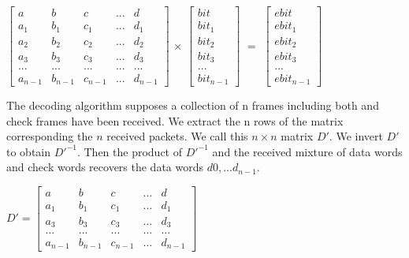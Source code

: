 \vspace{0.5cm}

\begin{center}
$
\begin{bmatrix} 
a   & b   & c   & ... & d   \\
a_1 & b_1 & c_1 & ... & d_1 \\
a_2 & b_2 & c_2 & ... & d_2 \\
a_3 & b_3 & c_3 & ... & d_3 \\
... & ... & ... & ... & ... \\
a_{n-1} & b_{n-1} & c_{n-1} & ... & d_{n-1} 
\end{bmatrix}
$
$\times$
$
\begin{bmatrix} 
bit \\ bit_1 \\ bit_2 \\ bit_3 \\...\\bit_{n-1} 
\end{bmatrix} 
$
$=$
$
\begin{bmatrix} 
ebit \\ ebit_1 \\ ebit_2 \\ ebit_3 \\ ... \\ ebit_{n-1} 
\end{bmatrix}
$
\end{center}

\vspace{0.5cm}

The decoding algorithm supposes a collection of n frames including both \ControlMessage  and check frames have been received. 
We extract the n rows of the matrix corresponding the $n$ received packets. We call this $n \times n$ matrix $D'$. We invert $D'$ to obtain $D'^{-1}$.
Then the product of $D'^{-1}$ and the received mixture of data words and check words recovers the data words $d0, ...d_{n-1}$.

\begin{center}
$D'=
\begin{bmatrix} 
a   & b   & c   & ... & d   \\
a_1 & b_1 & c_1 & ... & d_1 \\
a_3 & b_3 & c_3 & ... & d_3 \\
... & ... & ... & ... & ... \\
a_{n-1} & b_{n-1} & c_{n-1} & ... & d_{n-1} 
\end{bmatrix}
$
\end{center}
\vspace{0.5cm}

